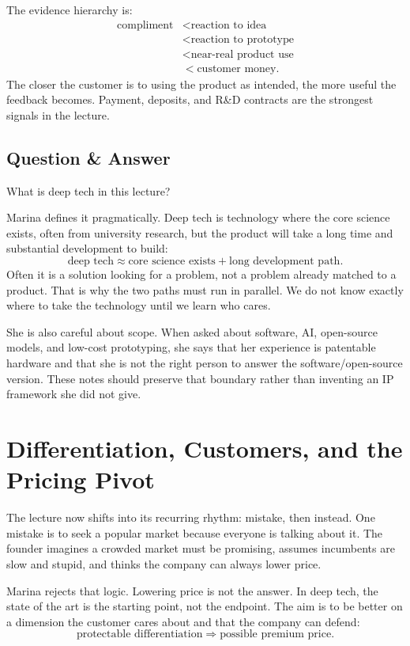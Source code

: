 The evidence hierarchy is:
\begin{align}
\text{compliment}
&< \text{reaction to idea} \\
&< \text{reaction to prototype} \\
&< \text{near-real product use} \\
&< \text{customer money}.
\end{align}
The closer the customer is to using the product as intended, the more useful the feedback becomes. Payment, deposits, and R\&D contracts are the strongest signals in the lecture.

\subsection{Question \& Answer}

What is deep tech in this lecture?

Marina defines it pragmatically. Deep tech is technology where the core science exists, often from university research, but the product will take a long time and substantial development to build:
\begin{equation}
\text{deep tech}
\approx
\text{core science exists}
+
\text{long development path}.
\end{equation}
Often it is a solution looking for a problem, not a problem already matched to a product. That is why the two paths must run in parallel. We do not know exactly where to take the technology until we learn who cares.

She is also careful about scope. When asked about software, AI, open-source models, and low-cost prototyping, she says that her experience is patentable hardware and that she is not the right person to answer the software/open-source version. These notes should preserve that boundary rather than inventing an IP framework she did not give.

\section{Differentiation, Customers, and the Pricing Pivot}

The lecture now shifts into its recurring rhythm: mistake, then instead. One mistake is to seek a popular market because everyone is talking about it. The founder imagines a crowded market must be promising, assumes incumbents are slow and stupid, and thinks the company can always lower price.

Marina rejects that logic. Lowering price is not the answer. In deep tech, the state of the art is the starting point, not the endpoint. The aim is to be better on a dimension the customer cares about and that the company can defend:
\begin{equation}
\text{protectable differentiation}
\Rightarrow
\text{possible premium price}.
\end{equation}

